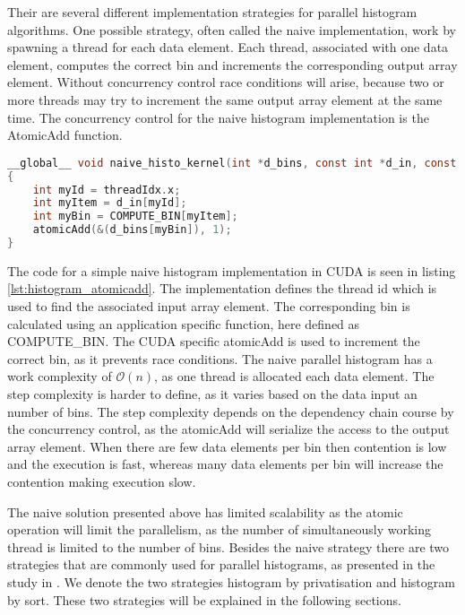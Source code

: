 Their are several different implementation strategies for parallel histogram algorithms. One possible strategy, often called the naive implementation, work by spawning a thread for each data element. Each thread, associated with one data element, computes the correct bin and increments the corresponding output array element. Without concurrency control race conditions will arise, because two or more threads may try to increment the same output array element at the same time. The concurrency control for the naive histogram implementation is the AtomicAdd function.

\begin{lstlisting}[language=C,caption={TBD},label=lst:histogram_atomicadd]
__global__ void naive_histo_kernel(int *d_bins, const int *d_in, const int BIN_COUNT)
{
	int myId = threadIdx.x;
	int myItem = d_in[myId];
	int myBin = COMPUTE_BIN[myItem];
	atomicAdd(&(d_bins[myBin]), 1);
}
\end{lstlisting}

The code for a simple naive histogram implementation in CUDA is seen in listing \ref{lst:histogram_atomicadd}. The implementation defines the thread id which is used to find the associated input array element. The corresponding bin is calculated using an application specific function, here defined as COMPUTE\_BIN. The CUDA specific atomicAdd is used to increment the correct bin, as it prevents race conditions. The naive parallel histogram has a work complexity of $\mathcal{O}(n)$, as one thread is allocated each data element. The step complexity is harder to define, as it varies based on the data input an number of bins. The step complexity depends on the dependency chain course by the concurrency control, as the atomicAdd will serialize the access to the output array element. When there are few data elements per bin then contention is low and the execution is fast, whereas many data elements per bin will increase the contention making execution slow. 

The naive solution presented above has limited scalability as the atomic operation will limit the parallelism, as the number of simultaneously working thread is limited to the number of bins. Besides the naive strategy there are two strategies that are commonly used for parallel histograms, as presented in the study in \cite{MilicHistogram}. We denote the two strategies histogram by privatisation and histogram by sort. These two strategies will be explained in the following sections.